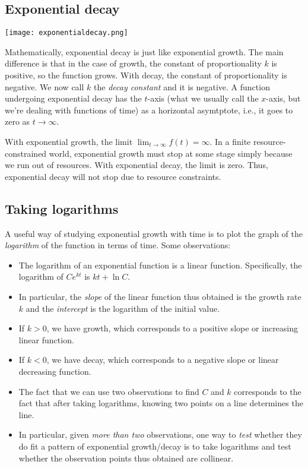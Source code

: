 \documentclass{amsart}
\begin{document}
\subsection{Exponential decay}

\texttt{[image: exponentialdecay.png]}

Mathematically, exponential decay is just like exponential growth. The
main difference is that in the case of growth, the constant of
proportionality $k$ is positive, so the function grows. With decay,
the constant of proportionality is negative. We now call $k$ the {\em
decay constant} and it is negative. A function undergoing exponential
decay has the $t$-axis (what we usually call the $x$-axis, but we're
dealing with functions of time) as a horizontal asymtptote, i.e., it
goes to zero as $t \to \infty$.

With exponential growth, the limit $\lim_{t \to \infty} f(t) =
\infty$. In a finite resource-constrained world, exponential growth
must stop at some stage simply because we run out of resources. With
exponential decay, the limit is zero. Thus, exponential decay will not
stop due to resource constraints.

\subsection{Taking logarithms}

A useful way of studying exponential growth with time is to plot the
graph of the {\em logarithm} of the function in terms of time. Some observations:

\begin{itemize}
\item The logarithm of an exponential function is a linear
  function. Specifically, the logarithm of $Ce^{kt}$ is $kt + \ln C$.
\item In particular, the {\em slope} of the linear function thus
  obtained is the growth rate $k$ and the {\em intercept} is the logarithm of the initial value.
\item If $k > 0$, we have growth, which corresponds to a positive
  slope or increasing linear function.
\item If $k < 0$, we have decay, which corresponds to a negative slope
  or linear decreasing function.
\item The fact that we can use two observations to find $C$ and $k$
  corresponds to the fact that after taking logarithms, knowing two
  points on a line determines the line.
\item In particular, given {\em more than two} observations, one way
  to {\em test} whether they do fit a pattern of exponential
  growth/decay is to take logarithms and test whether the observation
  points thus obtained are collinear.
\end{itemize}
\end{document}
